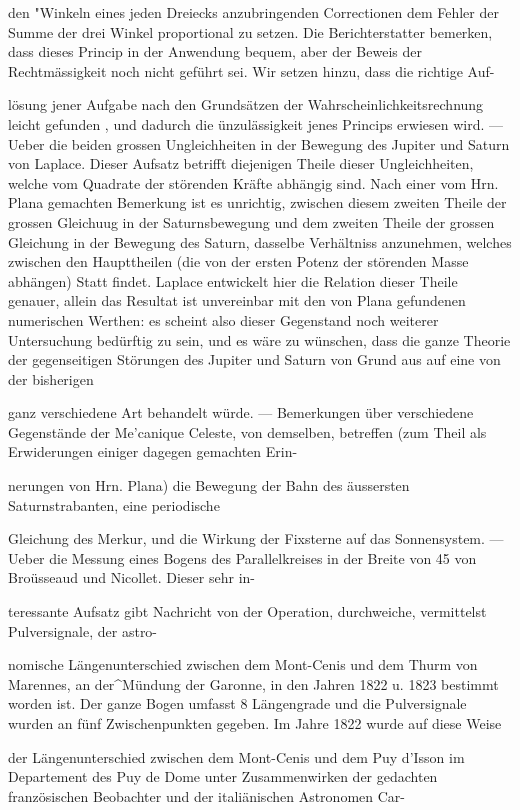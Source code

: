 \documentclass[10pt,a4paper]{article}
\begin{document}
den "Winkeln eines jeden Dreiecks anzubringenden Correctionen dem Fehler der Summe der drei Winkel proportional zu setzen. Die Berichterstatter bemerken, dass dieses Princip in der Anwendung bequem, aber der Beweis der Rechtmässigkeit noch nicht geführt sei. Wir setzen hinzu, dass die richtige Auf-

lösung jener Aufgabe nach den Grundsätzen der Wahrscheinlichkeitsrechnung leicht gefunden , und dadurch die ünzulässigkeit jenes Princips erwiesen wird. — Ueber die beiden grossen Ungleichheiten in der Bewegung des Jupiter und Saturn von Laplace. Dieser Aufsatz betrifft diejenigen Theile dieser Ungleichheiten, welche vom Quadrate der störenden Kräfte abhängig sind. Nach einer vom Hrn. Plana gemachten Bemerkung ist es unrichtig, zwischen diesem zweiten Theile der grossen Gleichuug in der Saturnsbewegung und dem zweiten Theile der grossen Gleichung in der Bewegung des Saturn, dasselbe Verhältniss anzunehmen, welches zwischen den Haupttheilen (die von der ersten Potenz der störenden Masse abhängen) Statt findet. Laplace entwickelt hier die Relation dieser Theile genauer, allein das Resultat ist unvereinbar mit den von Plana gefundenen numerischen Werthen: es scheint also dieser Gegenstand noch weiterer Untersuchung bedürftig zu sein, und es wäre zu wünschen, dass die ganze Theorie der gegenseitigen Störungen des Jupiter und Saturn von Grund aus auf eine von der bisherigen

ganz verschiedene Art behandelt würde. — Bemerkungen über verschiedene Gegenstände der Me'canique Celeste, von demselben, betreffen (zum Theil als Erwiderungen einiger dagegen gemachten Erin-

nerungen von Hrn. Plana) die Bewegung der Bahn des äussersten Saturnstrabanten, eine periodische

Gleichung des Merkur, und die Wirkung der Fixsterne auf das Sonnensystem. — Ueber die Messung eines Bogens des Parallelkreises in der Breite von 45\textdegree{} von Broüsseaud und Nicollet. Dieser sehr in-

teressante Aufsatz gibt Nachricht von der Operation, durchweiche, vermittelst Pulversignale, der astro-

nomische Längenunterschied zwischen dem Mont-Cenis und dem Thurm von Marennes, an der\textasciicircum{}Mündung der Garonne, in den Jahren 1822 u. 1823 bestimmt worden ist. Der ganze Bogen umfasst 8 Längengrade und die Pulversignale wurden an fünf Zwischenpunkten gegeben. Im Jahre 1822 wurde auf diese Weise

der Längenunterschied zwischen dem Mont-Cenis und dem Puy d'Isson im Departement des Puy de Dome unter Zusammenwirken der gedachten französischen Beobachter und der italiänischen Astronomen Car-
\end{document}
